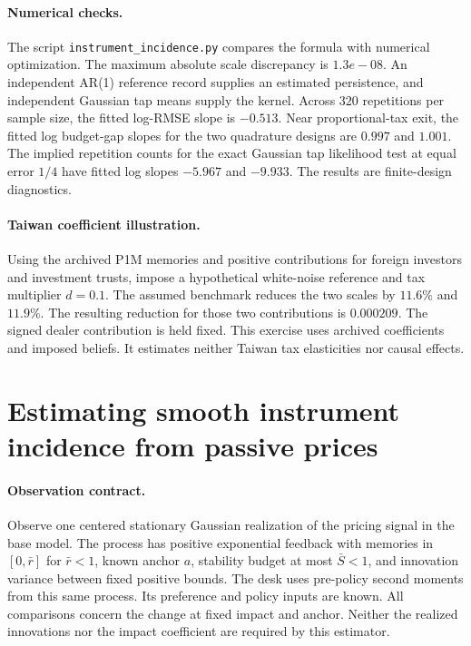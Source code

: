 \documentclass[12pt]{article}
\theoremstyle{definition}
\theoremstyle{remark}
\begin{document}
\paragraph{Numerical checks.} The script \nolinkurl{instrument_incidence.py} compares the formula with numerical optimization. The maximum absolute scale discrepancy is $ 1.3e-08$. An independent AR(1) reference record supplies an estimated persistence, and independent Gaussian tap means supply the kernel. Across $ 320$ repetitions per sample size, the fitted log-RMSE slope is $ -0.513$. Near proportional-tax exit, the fitted log budget-gap slopes for the two quadrature designs are $ 0.997$ and $ 1.001$. The implied repetition counts for the exact Gaussian tap likelihood test at equal error $1/4$ have fitted log slopes $ -5.967$ and $ -9.933$. The results are finite-design diagnostics.

\paragraph{Taiwan coefficient illustration.} Using the archived P1M memories and positive contributions for foreign investors and investment trusts, impose a hypothetical white-noise reference and tax multiplier $d=0.1$. The assumed benchmark reduces the two scales by $ 11.6\%$ and $ 11.9\%$. The resulting reduction for those two contributions is $ 0.000209$. The signed dealer contribution is held fixed. This exercise uses archived coefficients and imposed beliefs. It estimates neither Taiwan tax elasticities nor causal effects.


\section{Estimating smooth instrument incidence from passive prices}\label{app:passiveincidence}

\paragraph{Observation contract.}
Observe one centered stationary Gaussian realization of the pricing signal in
the base model. The process has positive exponential feedback with memories in
$[0,\bar r]$ for $\bar r<1$, known anchor $a$, stability budget at most $\bar S<1$,
and innovation variance between fixed positive bounds. The desk uses pre-policy
second moments from this same process. Its preference and policy inputs are
known. All comparisons concern the change at fixed impact and anchor. Neither the
realized innovations nor the impact coefficient are required by this estimator.
\end{document}
